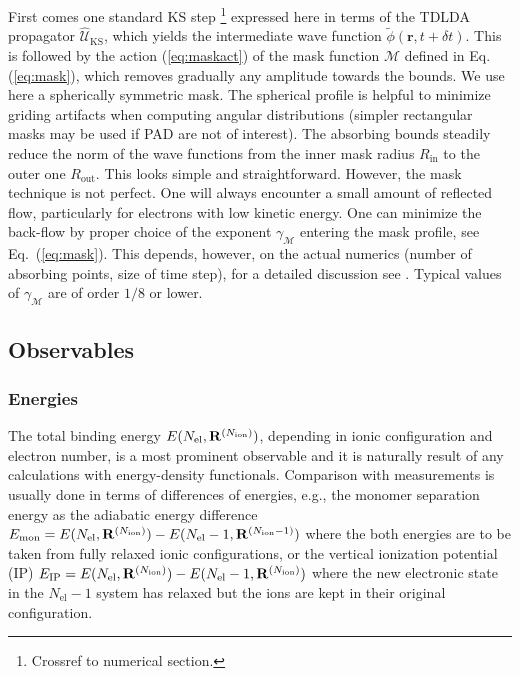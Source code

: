 \documentclass[final,1p]{elsarticle}
\newcommand{\PGRfoot}[1]{{\color{blue}\footnote{\color{blue} #1}}}
\begin{document}
%
First comes one standard KS step \PGRfoot{Crossref to numerical
  section.} expressed here in terms of the TDLDA propagator
$\hat{\mathcal{U}}_\mathrm{KS}$, which yields the intermediate wave
function $\tilde\phi(\mathbf{r},t\!+\!\delta{t})$. This is followed by
the action (\ref{eq:maskact}) of the mask function $\mathcal{M}$
defined in Eq.(\ref{eq:mask}), which removes gradually any amplitude
towards the bounds. We use here a spherically symmetric mask. The
spherical profile is helpful to minimize griding artifacts when
computing angular distributions \cite{Poh04b} (simpler rectangular
masks may be used if PAD are not of interest). The absorbing bounds
steadily reduce the norm of the wave functions from the inner mask
radius $R_\mathrm{in}$ to the outer one $R_\mathrm{out}$.  This looks
simple and straightforward. However, the mask technique is not
perfect. One will always encounter a small amount of reflected flow,
particularly for electrons with low kinetic energy. One can minimize
the back-flow by proper choice of the exponent $\gamma_\mathcal{M}$
entering the mask profile, see Eq.~(\ref{eq:mask}). This depends,
however, on the actual numerics (number of absorbing points, size of
time step), for a detailed discussion see \cite{Rei06c}. Typical
values of $\gamma_\mathcal{M}$ are of order $1/8$ or lower.


\subsection{Observables}
\label{sec:observ}


\subsubsection{Energies}
\label{sec:energies}

The total binding energy $E(N_\mathrm{el},{\bf R}^{(N_\mathrm{ion})})$,
depending in ionic configuration and electron number, is a most
prominent observable and it is naturally result of any calculations
with energy-density functionals.  Comparison with measurements is
usually done in terms of differences of energies, e.g., the monomer
separation energy as the adiabatic energy difference
%
$E_\mathrm{mon}=E(N_\mathrm{el},{\bf R}^{(N_\mathrm{ion})})
            -E(N_\mathrm{el}-1,{\bf R}^{(N_\mathrm{ion}-1)})$
%
where the both energies are to be taken from fully relaxed ionic
configurations, or the vertical ionization potential
(IP)
%
$E_\mathrm{IP}=E(N_\mathrm{el},{\bf R}^{(N_\mathrm{ion})})
            -E(N_\mathrm{el}-1,{\bf R}^{(N_\mathrm{ion})})$
%
where the new electronic state in the $N_\mathrm{el}-1$ system has
relaxed but the ions are kept in their original configuration.
\end{document}
